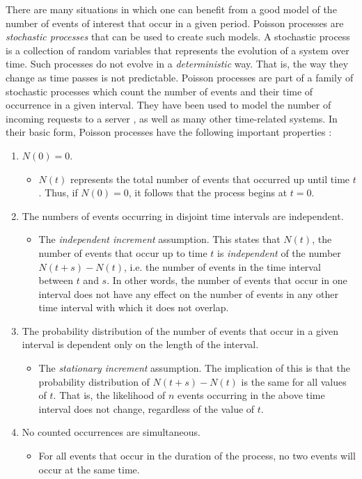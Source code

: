 \documentclass[a4paper,11pt,twoside]{article}
\begin{document}
   There are many situations in which one can benefit from a good model of the
   number of events of interest that occur in a given period. Poisson processes
   are \emph{stochastic processes} that can be used to create such models. A
   stochastic process is a collection of random variables that represents the
   evolution of a system over time. Such processes do not evolve in a
   \emph{deterministic} way. That is, the way they change as time passes is not
   predictable. Poisson processes are part of a family of stochastic processes
   which count the number of events and their time of occurrence in a given
   interval. They have been used to model the number of incoming requests to a
   server \cite{arlitt1997internet}, as well as many other time-related
   systems. In their basic form, Poisson processes have the following important
   properties \cite{ross1997simulation}:
\begin{enumerate}
\item $N(0)=0$.
\begin{itemize}
\item $N(t)$ represents the total number of events that occurred up until time
     $t$. Thus, if $N(0)=0$, it follows that the process begins at $t=0$.
\end{itemize}
\item The numbers of events occurring in disjoint time intervals are independent.
\begin{itemize}
\item The \emph{independent increment} assumption. This states that $N(t)$, the
     number of events that occur up to time $t$ is \emph{independent} of the
     number $N(t+s)-N(t)$, i.e. the number of events in the time interval
     between $t$ and $s$. In other words, the number of events that occur in one
     interval does not have any effect on the number of events in any other time
     interval with which it does not overlap.
\end{itemize}
\item The probability distribution of the number of events that occur in a given
   interval is dependent only on the length of the interval.
\begin{itemize}
\item The \emph{stationary increment} assumption. The implication of this is that
     the probability distribution of $N(t+s)-N(t)$ is the same for all values of
     $t$. That is, the likelihood of $n$ events occurring in the above time
     interval does not change, regardless of the value of $t$.
\end{itemize}
\item No counted occurrences are simultaneous.
\begin{itemize}
\item For all events that occur in the duration of the process, no two events
     will occur at the same time.
\end{itemize}
\end{enumerate}
\end{document}
